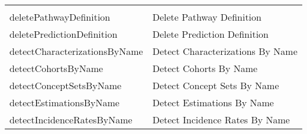 \documentclass[
]{article}
\begin{document}
\begin{longtable}[]{@{}ll@{}}
\begin{minipage}[t]{0.48\columnwidth}
\end{minipage}\tabularnewline
\begin{minipage}[t]{0.46\columnwidth}\raggedright
deletePathwayDefinition\strut
\end{minipage} & \begin{minipage}[t]{0.48\columnwidth}\raggedright
Delete Pathway Definition\strut
\end{minipage}\tabularnewline
\begin{minipage}[t]{0.46\columnwidth}\raggedright
deletePredictionDefinition\strut
\end{minipage} & \begin{minipage}[t]{0.48\columnwidth}\raggedright
Delete Prediction Definition\strut
\end{minipage}\tabularnewline
\begin{minipage}[t]{0.46\columnwidth}\raggedright
detectCharacterizationsByName\strut
\end{minipage} & \begin{minipage}[t]{0.48\columnwidth}\raggedright
Detect Characterizations By Name\strut
\end{minipage}\tabularnewline
\begin{minipage}[t]{0.46\columnwidth}\raggedright
detectCohortsByName\strut
\end{minipage} & \begin{minipage}[t]{0.48\columnwidth}\raggedright
Detect Cohorts By Name\strut
\end{minipage}\tabularnewline
\begin{minipage}[t]{0.46\columnwidth}\raggedright
detectConceptSetsByName\strut
\end{minipage} & \begin{minipage}[t]{0.48\columnwidth}\raggedright
Detect Concept Sets By Name\strut
\end{minipage}\tabularnewline
\begin{minipage}[t]{0.46\columnwidth}\raggedright
detectEstimationsByName\strut
\end{minipage} & \begin{minipage}[t]{0.48\columnwidth}\raggedright
Detect Estimations By Name\strut
\end{minipage}\tabularnewline
\begin{minipage}[t]{0.46\columnwidth}\raggedright
detectIncidenceRatesByName\strut
\end{minipage} & \begin{minipage}[t]{0.48\columnwidth}\raggedright
Detect Incidence Rates By Name\strut

\end{minipage}
\end{longtable}
\end{document}
